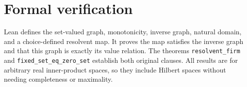 \documentclass[10pt,a4paper]{article}
\begin{document}
\section*{Formal verification}
Lean defines the set-valued graph, monotonicity, inverse graph, natural
domain, and a choice-defined resolvent map. It proves the map satisfies
the inverse graph and that this graph is exactly its value relation.
The theorems \texttt{resolvent\_firm} and
\texttt{fixed\_set\_eq\_zero\_set} establish both original clauses.
All results are for arbitrary real inner-product spaces, so they include
Hilbert spaces without needing completeness or maximality.
\end{document}
